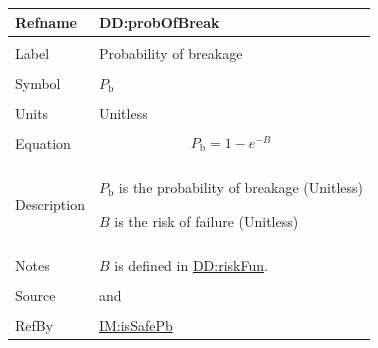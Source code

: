\documentclass[12pt]{article}
\begin{document}
\vspace{\baselineskip}
\noindent
\begin{minipage}{\textwidth}
\begin{tabular}{>{\raggedright}p{}>{\raggedright\arraybackslash}p{}}
\toprule \textbf{Refname} & \textbf{DD:probOfBreak}
\label{DD:probOfBreak}
\\ \midrule \\
Label & Probability of breakage
        
\\ \midrule \\
Symbol & ${P_{\text{b}}}$
         
\\ \midrule \\
Units & Unitless
        
\\ \midrule \\
Equation & \begin{displaymath}
           {P_{\text{b}}}=1-e^{-B}
           \end{displaymath}
\\ \midrule \\
Description & \begin{symbDescription}
              \item{${P_{\text{b}}}$ is the probability of breakage (Unitless)}
              \item{$B$ is the risk of failure (Unitless)}
              \end{symbDescription}
\\ \midrule \\
Notes & $B$ is defined in \hyperref[DD:riskFun]{DD:riskFun}.
        
\\ \midrule \\
Source & \cite{astm2009} and \cite{beasonEtAl1998}
         
\\ \midrule \\
RefBy & \hyperref[IM:isSafePb]{IM:isSafePb}
        
\\ \bottomrule
\end{tabular}
\end{minipage}
\end{document}
